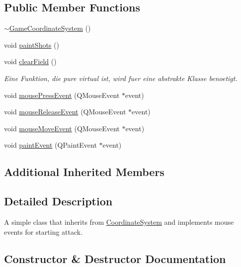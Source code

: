 \subsection*{Public Member Functions}
\begin{DoxyCompactItemize}
\item 
\hyperlink{classGUI_1_1GameCoordinateSystem_ad90026545ab4130f336058ad6e56a7ae}{$\sim$\+Game\+Coordinate\+System} ()
\item 
void \hyperlink{classGUI_1_1GameCoordinateSystem_a9458976a8507b7cf973c20418fb667a4}{paint\+Shots} ()
\item 
void \hyperlink{classGUI_1_1GameCoordinateSystem_afcf62685a11ce5529786cc14ddecc7f2}{clear\+Field} ()
\begin{DoxyCompactList}\small\item\em Eine Funktion, die pure virtual ist, wird fuer eine abstrakte Klasse benoetigt. \end{DoxyCompactList}\item 
void \hyperlink{classGUI_1_1GameCoordinateSystem_ad2272e344e46519f026cd02f419884f1}{mouse\+Press\+Event} (Q\+Mouse\+Event $\ast$event)
\item 
void \hyperlink{classGUI_1_1GameCoordinateSystem_a35226f6549add1ff837c65888fcd00fc}{mouse\+Release\+Event} (Q\+Mouse\+Event $\ast$event)
\item 
void \hyperlink{classGUI_1_1GameCoordinateSystem_ae820c6a86f0a1908bf451f86db043489}{mouse\+Move\+Event} (Q\+Mouse\+Event $\ast$event)
\item 
void \hyperlink{classGUI_1_1GameCoordinateSystem_accfb24f32254fb98c049727597a53956}{paint\+Event} (Q\+Paint\+Event $\ast$event)
\end{DoxyCompactItemize}
\subsection*{Additional Inherited Members}


\subsection{Detailed Description}
A simple class that inherits from \hyperlink{classGUI_1_1CoordinateSystem}{Coordinate\+System} and implements mouse events for starting attack. 

\subsection{Constructor \& Destructor Documentation}

